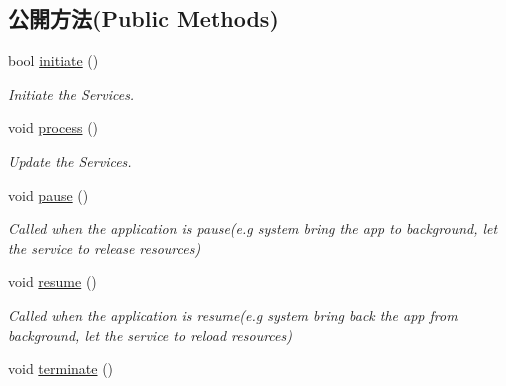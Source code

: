 \subsection*{公開方法(Public Methods)}
\begin{DoxyCompactItemize}
\item 
bool \hyperlink{class_magnum_1_1_video_1_1_manager_a561ebec411cdf6b41b91cfbb8d6422f4}{initiate} ()
\begin{DoxyCompactList}\small\item\em Initiate the Services. \end{DoxyCompactList}\item 
void \hyperlink{class_magnum_1_1_video_1_1_manager_afda0bea6def1b2387b3c48b8a472d5b7}{process} ()\hypertarget{class_magnum_1_1_video_1_1_manager_afda0bea6def1b2387b3c48b8a472d5b7}{}\label{class_magnum_1_1_video_1_1_manager_afda0bea6def1b2387b3c48b8a472d5b7}

\begin{DoxyCompactList}\small\item\em Update the Services. \end{DoxyCompactList}\item 
void \hyperlink{class_magnum_1_1_video_1_1_manager_af62ea72008ab069ba7348bb9dbe2ee8d}{pause} ()\hypertarget{class_magnum_1_1_video_1_1_manager_af62ea72008ab069ba7348bb9dbe2ee8d}{}\label{class_magnum_1_1_video_1_1_manager_af62ea72008ab069ba7348bb9dbe2ee8d}

\begin{DoxyCompactList}\small\item\em Called when the application is pause(e.\+g system bring the app to background, let the service to release resources) \end{DoxyCompactList}\item 
void \hyperlink{class_magnum_1_1_video_1_1_manager_a318faa055cdb1d1da6370ccdaa33480d}{resume} ()\hypertarget{class_magnum_1_1_video_1_1_manager_a318faa055cdb1d1da6370ccdaa33480d}{}\label{class_magnum_1_1_video_1_1_manager_a318faa055cdb1d1da6370ccdaa33480d}

\begin{DoxyCompactList}\small\item\em Called when the application is resume(e.\+g system bring back the app from background, let the service to reload resources) \end{DoxyCompactList}\item 
void \hyperlink{class_magnum_1_1_video_1_1_manager_a3a9b48bc7cad0f133f0bd874a12752da}{terminate} ()\hypertarget{class_magnum_1_1_video_1_1_manager_a3a9b48bc7cad0f133f0bd874a12752da}{}\label{class_magnum_1_1_video_1_1_manager_a3a9b48bc7cad0f133f0bd874a12752da}


\end{DoxyCompactItemize}
